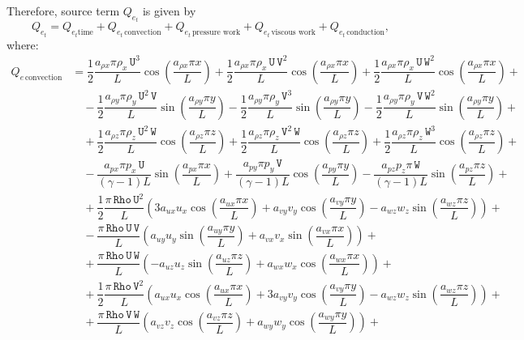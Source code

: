\documentclass[10pt]{article}
\newcommand{\Rho}{\,\mathtt{Rho}}
\newcommand{\U}{\,\mathtt{U}}
\newcommand{\V}{\,\mathtt{V}}
\newcommand{\W}{\,\mathtt{W}}
\newcommand{\convection}{\,\text{convection}}
\newcommand{\conduction}{\,\text{conduction}}
\newcommand{\workpressure}{\,\text{pressure work}}
\newcommand{\workviscous}{\,\text{viscous work}}
\begin{document}
Therefore, source term $Q_{e_t}$ is given by
$$Q_{e_t} = Q_{e_t \text{time}} + Q_{e_t \convection} + Q_{e_t \workpressure}+ Q_{e_t \workviscous} + Q_{e_t \conduction}, $$
where:
\begin{equation*}
\begin{split}
 Q_{e \convection} &= 
\dfrac{1}{2} \dfrac{a_{\rho x} \pi \rho_x \U^3 }{L}\cos\left(\dfrac{a_{\rho x} \pi x}{L}\right) 
+\dfrac{1}{2} \dfrac{a_{\rho x} \pi \rho_x \U \V^2 }{L}\cos\left(\dfrac{a_{\rho x} \pi x}{L}\right)
+\dfrac{1}{2} \dfrac{a_{\rho x} \pi \rho_x \U \W^2 }{L}\cos\left(\dfrac{a_{\rho x} \pi x}{L}\right)+\\
&\quad
-\dfrac{1}{2} \dfrac{a_{\rho y} \pi \rho_y \U^2 \V }{L}\sin\left(\dfrac{a_{\rho y} \pi y}{L}\right)
-\dfrac{1}{2} \dfrac{a_{\rho y} \pi \rho_y \V^3 }{L}\sin\left(\dfrac{a_{\rho y} \pi y}{L}\right)
-\dfrac{1}{2} \dfrac{a_{\rho y} \pi \rho_y \V \W^2 }{L}\sin\left(\dfrac{a_{\rho y} \pi y}{L}\right)+\\
&\quad
+\dfrac{1}{2} \dfrac{a_{\rho z} \pi \rho_z \U^2 \W }{L}\cos\left(\dfrac{a_{\rho z} \pi z}{L}\right) 
+\dfrac{1}{2} \dfrac{a_{\rho z} \pi \rho_z \V^2 \W }{L}\cos\left(\dfrac{a_{\rho z} \pi z}{L}\right) 
+\dfrac{1}{2} \dfrac{a_{\rho z} \pi \rho_z \W^3 }{L}\cos\left(\dfrac{a_{\rho z} \pi z}{L}\right)+\\
&\quad
- \dfrac{a_{px} \pi p_x \U }{(\gamma-1) L}\sin\left(\dfrac{a_{px} \pi x}{L}\right)
+ \dfrac{a_{py} \pi p_y \V }{(\gamma-1) L}\cos\left(\dfrac{a_{py} \pi y}{L}\right)
- \dfrac{a_{pz} p_z \pi \W }{(\gamma-1) L}\sin\left(\dfrac{a_{pz} \pi z}{L}\right)+\\
&\quad
+\dfrac{1}{2} \dfrac{\pi \Rho \U^2}{L}\left(3 a_{ux} u_x \cos\left(\dfrac{a_{ux} \pi x}{L}\right)+a_{vy} v_y \cos\left(\dfrac{a_{vy} \pi y}{L}\right)-a_{wz} w_z \sin\left(\dfrac{a_{wz} \pi z}{L}\right)\right) +\\
&\quad-\dfrac{\pi \Rho \U \V}{L}\left(a_{uy} u_y \sin\left(\dfrac{a_{uy} \pi y}{L}\right)+a_{vx} v_x \sin\left(\dfrac{a_{vx} \pi x}{L}\right)\right) +\\
&\quad+ \dfrac{\pi \Rho \U \W}{L}\left(-a_{uz} u_z \sin\left(\dfrac{a_{uz} \pi z}{L}\right)+a_{wx} w_x \cos\left(\dfrac{a_{wx} \pi x}{L}\right)\right)+\\
&\quad+\dfrac{1}{2} \dfrac{\pi \Rho \V^2}{L}\left(a_{ux} u_x \cos\left(\dfrac{a_{ux} \pi x}{L}\right)+3 a_{vy} v_y \cos\left(\dfrac{a_{vy} \pi y}{L}\right)-a_{wz} w_z \sin\left(\dfrac{a_{wz} \pi z}{L}\right)\right) +\\
&\quad+  \dfrac{\pi \Rho \V \W}{L}\left(a_{vz} v_z \cos\left(\dfrac{a_{vz} \pi z}{L}\right)+a_{wy} w_y \cos\left(\dfrac{a_{wy} \pi y}{L}\right)\right)+\\

\end{split}
\end{equation*}
\end{document}
